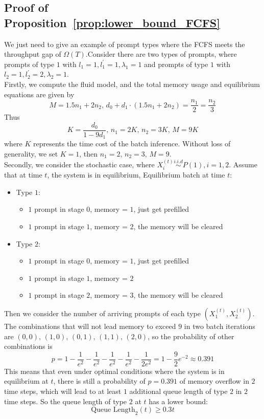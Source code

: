 \subsection{Proof of Proposition~\ref{prop:lower_bound_FCFS}}\label{appendix::proof of lower bound of of FCFS}
We just need to give an example of prompt types where the FCFS meets the throughput gap of $\Omega(T)$.Consider there are two types of prompts, where prompts of type $1$ with $l_1=1, l_1^\prime=1, \lambda_1=1$ and prompts of type $1$ with $l_2=1, l_2^\prime=2, \lambda_2=1$. \\
Firstly, we compute the fluid model, and the total memory usage and equilibrium equations are given by
$$M = 1.5n_1+2n_2,\, d_0+d_1\cdot (1.5n_1+2n_2) = \frac{n_1}{2}=\frac{n_2}{3}$$
Thus
$$K = \frac{d_0}{1-9d_1},\, n_1 = 2K,\, n_2=3K,\, M=9K$$
where $K$ represents the time cost of the batch inference. Without loss of generality, we set $K=1$, then $n_1=2, \,n_2=3,\,M=9 $. \\
Secondly, we consider the stochastic case, where $X_i^{(t)}\overset{i.i.d}{\sim} P(1), i=1,2$. Assume that at time $t$, the system is in equilibrium, Equilibrium batch at time $t$:
\begin{itemize}
    \item Type $1$:
    \begin{itemize}
        \itemsep0em
        \item $1$ prompt in stage $0$, memory = $1$, just get prefilled
        \item $1$ prompt in stage $1$, memory = $2$, the memory will be cleared
    \end{itemize}
    \item Type $2$:
    \begin{itemize}
        \itemsep0em
        \item $1$ prompt in stage $0$, memory = $1$, just get prefilled
        \item $1$ prompt in stage $1$, memory = $2$
        \item $1$ prompt in stage $2$, memory = $3$, the memory will be cleared
    \end{itemize}
\end{itemize}
Then we consider the number of arriving prompts of each type $(X_1^{(t)}, X_2^{(t)})$. The combinations that will not lead memory to exceed $9$ in two batch iterations are $(0,0),\,(1,0),\,(0,1),\,(1,1),\,(2,0)$, so the probability of other combinations is 
$$p = 1 - \frac{1}{e^2}- \frac{1}{e^2}- \frac{1}{e^2}- \frac{1}{e^2}- \frac{1}{2e^2}=1- \frac{9}{2}e^{-2} \approx 0.391 $$
This means that even under optimal conditions where the system is in equilibrium at $t$, there is still a probability of $p = 0.391$ of memory overflow in $2$ time steps, which will lead to at least $1$ additional queue length of type $2$ in $2$ time steps. So the queue length of type $2$ at $t$ has a lower bound:
$$\text{Queue Length}_2(t) \geq 0.3t$$

